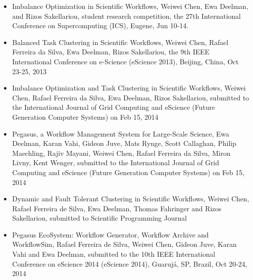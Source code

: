 \begin{itemize}
\item Imbalance Optimization in Scientific Workflows, Weiwei Chen, Ewa Deelman, and Rizos Sakellariou, student research competition, the 27th International Conference on Supercomputing (ICS), Eugene, Jun 10-14.

\item Balanced Task Clustering in Scientific Workflows, Weiwei Chen, Rafael Ferreira da Silva, Ewa Deelman, Rizos Sakellariou, the 9th IEEE International Conference on e-Science (eScience 2013), Beijing, China, Oct 23-25, 2013

\item Imbalance Optimization and Task Clustering in Scientific Workflows, Weiwei Chen, Rafael Ferreira da Silva, Ewa Deelman, Rizos Sakellariou, submitted to the International Journal of Grid Computing and eScience (Future Generation Computer Systems) on Feb 15, 2014

\item Pegasus, a Workflow Management System for Large-Scale Science, Ewa Deelman, Karan Vahi, Gideon Juve, Mats Rynge, Scott Callaghan, Philip Maechling, Rajiv Mayani, Weiwei Chen, Rafael Ferreira da Silva, Miron Livny, Kent Wenger, submitted to the International Journal of Grid Computing and eScience (Future Generation Computer Systems) on Feb 15, 2014
\item Dynamic and Fault Tolerant Clustering in Scientific Workflows, Weiwei Chen, Rafael Ferreira de Silva, Ewa Deelman, Thomas Fahringer and Rizos Sakellariou, submitted to Scientific Programming Journal 
\item Pegasus EcoSystem: Workflow Generator, Workflow Archive and WorkflowSim, Rafael Ferreira de Silva, Weiwei Chen, Gideon Juve, Karan Vahi and Ewa Deelman, submitted to the 10th IEEE International Conference on eScience 2014 (eScience 2014), Guarujá, SP, Brazil, Oct 20-24, 2014

\end{itemize}